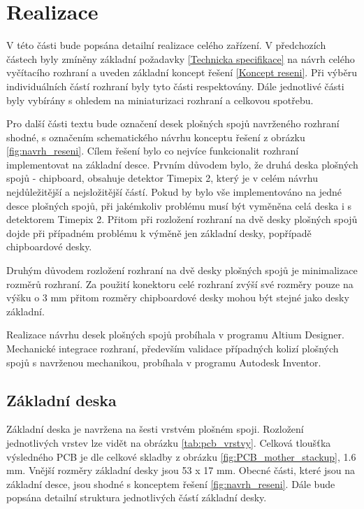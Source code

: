 \chapter{Realizace}
\label{realizace}
V této části bude popsána detailní realizace celého zařízení. V předchozích částech byly zmíněny základní požadavky \ref{Technicka specifikace} na návrh celého vyčítacího rozhraní a uveden základní koncept řešení \ref{Koncept reseni}. Při výběru individuálních částí rozhraní byly tyto části respektovány. Dále jednotlivé části byly vybírány s ohledem na miniaturizaci rozhraní a celkovou spotřebu. 

\par Pro další části textu bude označení desek plošných spojů navrženého rozhraní shodné, s označením schematického návrhu konceptu řešení z obrázku \ref{fig:navrh_reseni}. Cílem řešení bylo co nejvíce funkcionalit rozhraní implementovat na základní desce. Prvním důvodem bylo, že druhá deska plošných spojů - chipboard, obsahuje detektor Timepix 2, který je v celém návrhu nejdůležitější a nejsložitější částí. Pokud by bylo vše implementováno na jedné desce plošných spojů, při jakémkoliv problému musí být vyměněna celá deska i s detektorem Timepix 2. Přitom při rozložení rozhraní na dvě desky plošných spojů dojde při případném problému k výměně jen základní desky, popřípadě chipboardové desky. 
\par Druhým důvodem rozložení rozhraní na dvě desky plošných spojů je minimalizace rozměrů rozhraní. Za použití konektoru celé rozhraní zvýší své rozměry pouze na výšku o 3 mm přitom rozměry chipboardové desky mohou být stejné jako desky základní.

\par Realizace návrhu desek plošných spojů probíhala v programu Altium Designer. Mechanické integrace rozhraní, především validace případných kolizí plošných spojů s navrženou mechanikou, probíhala v programu Autodesk Inventor.

\section{Základní deska}	
	Základní deska je navržena na šesti vrstvém plošném spoji. Rozložení jednotlivých vrstev lze vidět na obrázku \ref{tab:pcb_vrstvy}. Celková tloušťka výsledného PCB je dle celkové skladby z obrázku \ref{fig:PCB_mother_stackup}, 1.6 mm. Vnější rozměry základní desky jsou 53 x 17 mm. Obecné části, které jsou na základní desce, jsou shodné s konceptem řešení \ref{fig:navrh_reseni}. Dále bude popsána detailní struktura jednotlivých částí základní desky.

